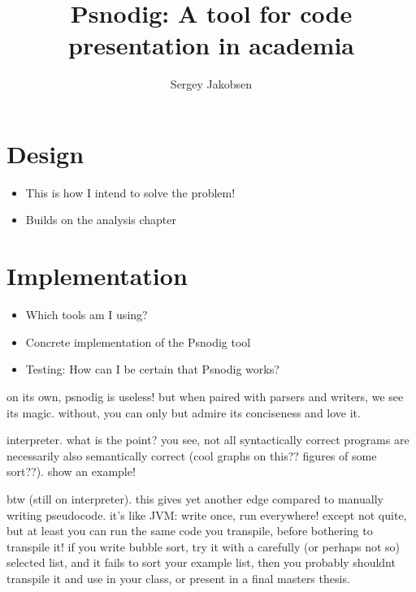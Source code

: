 \documentclass[twoside, openright, a4paper,  UKenglish]{report}
\begin{document}
\title{Psnodig: A tool for code presentation in academia}
\author{Sergey Jakobsen}
\uiomasterfp[program={Informatics: Programming and System Architecture}, binding, colour=green] %
\setcounter{page}{1}




\renewcommand*\contentsname{Contents}
\tableofcontents







\chapter{Design}
\begin{itemize}
    \item This is how I intend to solve the problem! %
    \item Builds on the analysis chapter
\end{itemize}


\chapter{Implementation}
\begin{itemize}
    \item Which tools am I using?
    \item Concrete implementation of the Psnodig tool
    \item Testing: How can I be certain that Psnodig works?
\end{itemize}

on its own, psnodig is useless! but when paired with parsers and writers, we see its magic. without, you can only but admire its conciseness and love it.

interpreter. what is the point? you see, not all syntactically correct programs are necessarily also semantically correct (cool graphs on this?? figures of some sort??). show an example!

btw (still on interpreter). this gives yet another edge compared to manually writing pseudocode. it's like JVM: write once, run everywhere! except not quite, but at least you can run the same code you transpile, before bothering to transpile it! if you write bubble sort, try it with a carefully (or perhaps not so) selected list, and it fails to sort your example list, then you probably shouldnt transpile it and use in your class, or present in a final masters thesis.
\end{document}
